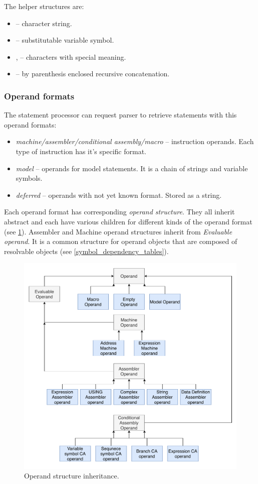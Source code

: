 The helper structures are:
\begin{itemize}
	\item {} -- character string.
	\item {} -- substitutable variable symbol.
	\item {},  -- characters with special meaning.
	\item {} -- by parenthesis enclosed recursive concatenation.
\end{itemize}

\subsubsection{Operand formats}
The statement processor can request parser to retrieve statements with this operand formats:
\begin{itemize}
	\item \emph{machine/assembler/conditional assembly/macro} -- instruction operands. Each type of instruction has it's specific format.
	\item \emph{model} -- operands for model statements. It is a chain of strings and variable symbols.
	\item \emph{deferred} -- operands with not yet known format. Stored as a string.
\end{itemize}

Each operand format has corresponding \emph{operand structure}. They all inherit abstract  and each have various children for different kinds of the operand format (see \cref{fig06:operand_arch}). Assembler and Machine operand structures inherit from \emph{Evaluable operand}. It is a common structure for operand objects that are composed of resolvable objects (see \cref{symbol_dependency_tables}).

\begin{figure}[H]
	\centering
	\includegraphics[width=\textwidth]{img/operand_arch}
	\caption{Operand structure inheritance.}
	\label{fig06:operand_arch}
\end{figure}

